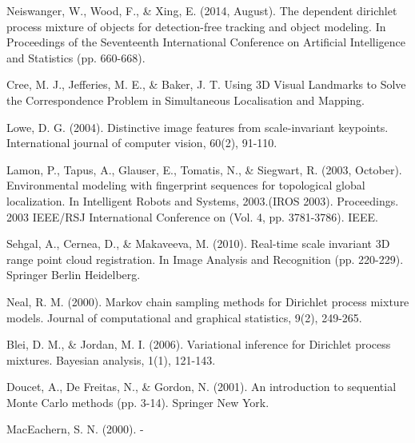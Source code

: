 \documentclass[]{article}
\begin{document}
\begin{thebibliography}{99}
            \newblock Neiswanger, W., Wood, F., \& Xing, E. (2014, August). The dependent dirichlet process mixture of objects for detection-free tracking and object modeling. In Proceedings of the Seventeenth International Conference on Artificial Intelligence and Statistics (pp. 660-668).

            \newblock Cree, M. J., Jefferies, M. E., \& Baker, J. T. Using 3D Visual Landmarks to Solve the Correspondence Problem in Simultaneous Localisation and Mapping.

            \newblock Lowe, D. G. (2004). Distinctive image features from scale-invariant keypoints. International journal of computer vision, 60(2), 91-110.

            \newblock Lamon, P., Tapus, A., Glauser, E., Tomatis, N., \& Siegwart, R. (2003, October). Environmental modeling with fingerprint sequences for topological global localization. In Intelligent Robots and Systems, 2003.(IROS 2003). Proceedings. 2003 IEEE/RSJ International Conference on (Vol. 4, pp. 3781-3786). IEEE.


            \newblock Sehgal, A., Cernea, D., \& Makaveeva, M. (2010). Real-time scale invariant 3D range point cloud registration. In Image Analysis and Recognition (pp. 220-229). Springer Berlin Heidelberg.

            \newblock Neal, R. M. (2000). Markov chain sampling methods for Dirichlet process mixture models. Journal of computational and graphical statistics, 9(2), 249-265.

            \newblock Blei, D. M., \& Jordan, M. I. (2006). Variational inference for Dirichlet process mixtures. Bayesian analysis, 1(1), 121-143.


            \newblock Doucet, A., De Freitas, N., \& Gordon, N. (2001). An introduction to sequential Monte Carlo methods (pp. 3-14). Springer New York.

            \newblock MacEachern, S. N. (2000). -



\end{thebibliography}
\end{document}
